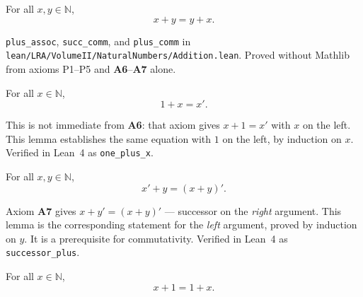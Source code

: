 \begin{theorem}
\label{thm:landau-plus-comm}
For all $x, y \in \mathbb{N}$,
\[
  x + y = y + x.
\]
\end{theorem}

\begin{remark*}
\texttt{plus\_assoc}, \texttt{succ\_comm}, and \texttt{plus\_comm} in
\texttt{lean/LRA/VolumeII/NaturalNumbers/Addition.lean}.
Proved without Mathlib from axioms P1--P5 and \textbf{A6}--\textbf{A7} alone.
\end{remark*}

\begin{lemma}
\label{lem:landau-one-plus-x}
For all $x \in \mathbb{N}$,
\[
  1 + x = x'.
\]
\end{lemma}

\begin{remark*}
This is not immediate from \textbf{A6}: that axiom gives $x + 1 = x'$
with $x$ on the left. This lemma establishes the same equation with $1$
on the left, by induction on $x$.
Verified in Lean~4 as \texttt{one\_plus\_x}.
\end{remark*}

\begin{lemma}
\label{lem:landau-successor-plus}
For all $x, y \in \mathbb{N}$,
\[
  x' + y = (x + y)'.
\]
\end{lemma}

\begin{remark*}
Axiom \textbf{A7} gives $x + y' = (x + y)'$ --- successor on the
\emph{right} argument. This lemma is the corresponding statement for
the \emph{left} argument, proved by induction on $y$.
It is a prerequisite for commutativity.
Verified in Lean~4 as \texttt{successor\_plus}.
\end{remark*}

\begin{lemma}
\label{lem:landau-add-one-comm}
For all $x \in \mathbb{N}$,
\[
  x + 1 = 1 + x.
\]
\end{lemma}

